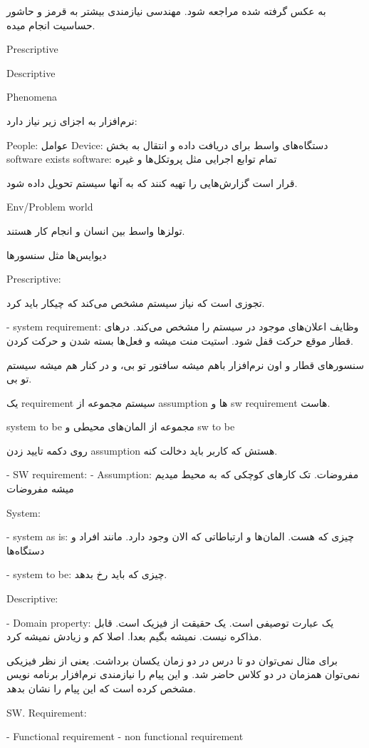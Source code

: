 به عکس گرفته شده مراجعه شود. مهندسی نیازمندی بیشتر به قرمز و حاشور حساسیت انجام
میده.

Prescriptive

Descriptive

Phenomena

نرم‌افزار به اجزای زیر نیاز دارد:

People: عوامل
Device: دستگاه‌های واسط برای دریافت داده و انتقال به بخش software
exists software: تمام توابع اجرایی مثل پروتکل‌ها و غیره

قرار است گزارش‌هایی را تهیه کنند که به آنها سیستم تحویل داده شود.

Env/Problem world

تولز‌ها واسط بین انسان و انجام کار هستند.

دیوایس‌ها مثل سنسور‌ها

Prescriptive:

تجوزی است که نیاز سیستم مشخص می‌کند که چیکار باید کرد.

- system requirement: وظایف اعلان‌های موجود در سیستم را مشخص می‌کند.  در‌های
قطار موقع حرکت قفل شود. استیت منت میشه و فعل‌ها بسته شدن و حرکت کردن.

سنسور‌های قطار و اون نرم‌افزار باهم میشه سافتور تو بی، و در کنار هم میشه سیستم
تو بی.

یک requirement سیستم مجموعه‌ از assumption ها و sw requirement هاست.

system to be مجموعه از المان‌های‌ محیطی و sw to be

روی دکمه تایید زدن assumption هستش که کاربر باید دخالت کنه.

- SW requirement: 
- Assumption: مفروضات. تک کار‌های کوچکی که به محیط میدیم میشه مفروضات

System:

- system as is: چیزی که هست. المان‌ها و ارتباطاتی که الان وجود دارد.
مانند افراد و دستگاه‌ها

- system to be: چیزی که باید رخ بدهد.

Descriptive:

- Domain property: یک عبارت توصیفی است. یک حقیقت از فیزیک است. قابل مذاکره نیست.
نمیشه بگیم بعدا. اصلا کم و زیادش نمیشه کرد.

برای مثال نمی‌توان دو تا درس در دو زمان یکسان برداشت. یعنی از نظر فیزیکی
نمی‌توان همزمان در دو کلاس حاضر شد. و این پیام را نیازمندی نرم‌افزار برنامه نویس
مشخص کرده است که این پیام را نشان بدهد.

SW. Requirement:

- Functional requirement
- non functional requirement

